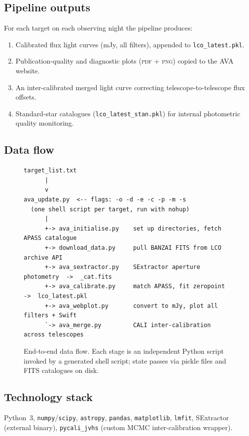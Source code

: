 \documentclass[12pt,a4paper]{article}
\begin{document}
\subsection{Pipeline outputs}

For each target on each observing night the pipeline produces:
\begin{enumerate}
  \item Calibrated flux light curves (mJy, all filters), appended to \texttt{lco\_latest.pkl}.
  \item Publication-quality and diagnostic plots (\textsc{pdf} + \textsc{png}) copied to the
        AVA website.
  \item An inter-calibrated merged light curve correcting telescope-to-telescope flux offsets.
  \item Standard-star catalogues (\texttt{lco\_latest\_stan.pkl}) for internal photometric
        quality monitoring.
\end{enumerate}

\subsection{Data flow}

\begin{figure}[h!]
\centering
\begin{minipage}{0.85\linewidth}
\begin{lstlisting}[style=shell]
target_list.txt
      |
      v
ava_update.py  <-- flags: -o -d -e -c -p -m -s
  (one shell script per target, run with nohup)
      |
      +-> ava_initialise.py    set up directories, fetch APASS catalogue
      +-> download_data.py     pull BANZAI FITS from LCO archive API
      +-> ava_sextractor.py    SExtractor aperture photometry  ->  _cat.fits
      +-> ava_calibrate.py     match APASS, fit zeropoint  ->  lco_latest.pkl
      +-> ava_webplot.py       convert to mJy, plot all filters + Swift
      `-> ava_merge.py         CALI inter-calibration across telescopes
\end{lstlisting}
\end{minipage}
\caption{End-to-end data flow.  Each stage is an independent Python script
  invoked by a generated shell script; state passes via pickle files and FITS
  catalogues on disk.}
\label{fig:flow}
\end{figure}

\subsection{Technology stack}
Python~3, \texttt{numpy}/\texttt{scipy}, \texttt{astropy}, \texttt{pandas},
\texttt{matplotlib}, \texttt{lmfit}, SExtractor (external binary),
\texttt{pycali\_jvhs} (custom MCMC inter-calibration wrapper).
\end{document}
